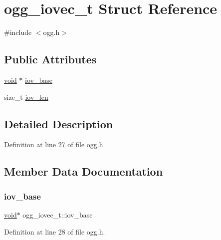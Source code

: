 \hypertarget{structogg__iovec__t}{}\section{ogg\+\_\+iovec\+\_\+t Struct Reference}
\label{structogg__iovec__t}


{\ttfamily \#include $<$ogg.\+h$>$}

\subsection*{Public Attributes}
\begin{DoxyCompactItemize}
\item 
\mbox{\hyperlink{_s_d_l__opengles2__gl2ext_8h_ae5d8fa23ad07c48bb609509eae494c95}{void}} $\ast$ \mbox{\hyperlink{structogg__iovec__t_a07c65ea68e539cc10ed1670c0de8aea0}{iov\+\_\+base}}
\item 
size\+\_\+t \mbox{\hyperlink{structogg__iovec__t_a52b887e0511104920cdc181c9e4136ce}{iov\+\_\+len}}
\end{DoxyCompactItemize}


\subsection{Detailed Description}


Definition at line 27 of file ogg.\+h.



\subsection{Member Data Documentation}
\mbox{\label{structogg__iovec__t_a07c65ea68e539cc10ed1670c0de8aea0}} 
\subsubsection{\texorpdfstring{iov\_base}{iov\_base}}
{\footnotesize\ttfamily \mbox{\hyperlink{_s_d_l__opengles2__gl2ext_8h_ae5d8fa23ad07c48bb609509eae494c95}{void}}$\ast$ ogg\+\_\+iovec\+\_\+t\+::iov\+\_\+base}



Definition at line 28 of file ogg.\+h.

\mbox{\label{structogg__iovec__t_a52b887e0511104920cdc181c9e4136ce}} 
